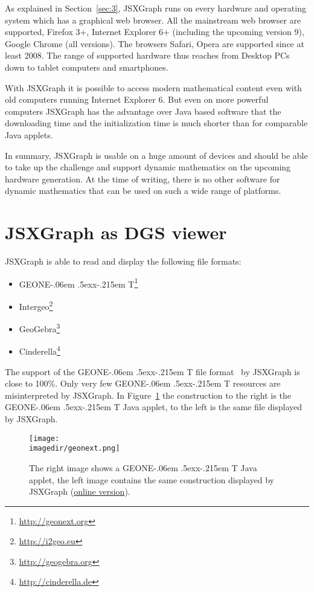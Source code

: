 \documentclass[12pt,a4paper]{article}%
\def\GEONExT{GEONE\kern-.06em \lower.5ex\hbox{x}\kern-.215em T}
\newcommand{\imagedir}{pics}
\begin{document}
As explained in Section~\ref{sec:3}, JSXGraph runs on every hardware and operating system which has a graphical 
web browser. 
All the mainstream web browser are supported, Firefox 3+, Internet Explorer
6+ (including the upcoming version 9), Google Chrome (all versions). 
The browsers Safari, Opera are supported since at least 2008. 
The range of supported hardware thus reaches from Desktop PCs 
down to tablet computers and smartphones. 

With JSXGraph it is possible to access modern mathematical content even with old computers
running Internet Explorer 6.
But even on more powerful computers JSXGraph has the advantage over Java based software 
that the downloading time and the initialization time is much shorter than for comparable Java applets. 

In summary, JSXGraph is usable on a huge amount of devices and should be able to take up the challenge and support dynamic mathematics on the upcoming hardware generation.
At the time of writing, there is no other software for dynamic mathematics that can be used on such a wide range of 
platforms.


\section{JSXGraph as DGS viewer}
JSXGraph is able to read and display the following file formats:
\begin{itemize} 
\item \GEONExT{}\footnote{\href{http://geonext.org}{http://geonext.org}}
\item Intergeo\footnote{\href{http://i2geo.eu}{http://i2geo.eu}}
\item GeoGebra\footnote{\href{geogebra.org}{http://geogebra.org}}
\item Cinderella\footnote{\href{http://cinderella.de}{http://cinderella.de}}
\end{itemize}
The support of the \GEONExT{} file format~\cite{ehmann2003,ehmann2008} by JSXGraph is close to 100\%. 
Only very few \GEONExT{} resources are misinterpreted by JSXGraph. 
In Figure~\ref{fig:geonext} the construction to the right is the \GEONExT{} Java applet, to the left is the same file displayed by JSXGraph.
\begin{figure}[ht]
\begin{center}
\texttt{[image: \\imagedir/geonext.png]}\\
\caption{The right image shows a \GEONExT{} Java applet, 
the left image contains the same construction displayed 
by JSXGraph
(\href{http://jsxgraph.uni-bayreuth.de/talks/cadgme10/talk/jsx_gxt.html}{online version}).}\label{fig:geonext}
\end{center}
\end{figure}
\end{document}
